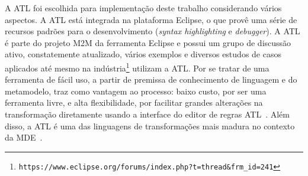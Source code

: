 A ATL foi escolhida para implementação deste trabalho considerando vários aspectos. A ATL está integrada na plataforma Eclipse, o que provê uma série de recursos padrões para o desenvolvimento (\textit{syntax highlighting} e \textit{debugger}). A ATL é parte do projeto M2M da ferramenta Eclipse e possui um grupo de discussão ativo, constatemente atualizado, vários exemplos e diversos estudos de casos aplicados até mesmo na indústria\footnote{\texttt{\texttt{https://www.eclipse.org/forums/index.php?t=thread&frm_id=241}}} utilizam a ATL. Por se tratar de uma ferramenta de fácil uso, a partir de premissa de conhecimento de linguagem e do metamodelo, traz como vantagem ao processo: baixo custo, por ser uma ferramenta livre, e alta flexibilidade, por facilitar grandes alterações na transformação diretamente usando a interface do editor de regras ATL~\cite{Salem_2008}. Além disso, a ATL é uma das linguagens de transformações mais madura no contexto da MDE~\cite{bruneliere_2010}.




































